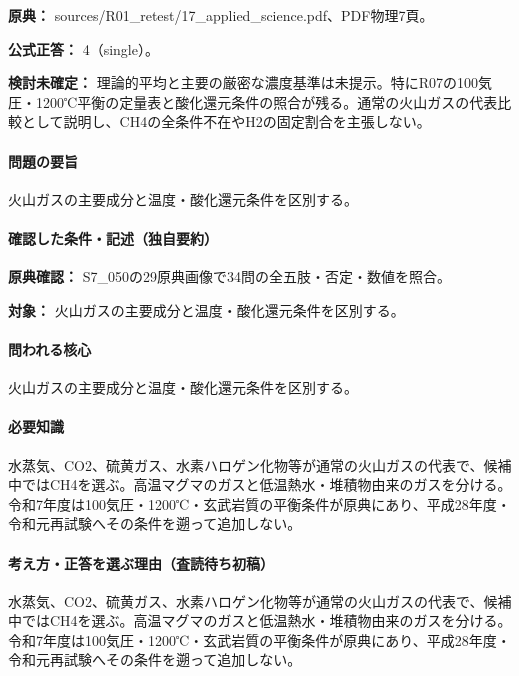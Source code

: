 \noindent\textbf{原典：} sources/R01\_retest/17\_applied\_science.pdf、PDF物理7頁。

\textbf{公式正答：} 4（single）。

\par\textbf{検討未確定：} 理論的平均と主要の厳密な濃度基準は未提示。特にR07の100気圧・1200℃平衡の定量表と酸化還元条件の照合が残る。通常の火山ガスの代表比較として説明し、CH4の全条件不在やH2の固定割合を主張しない。

\paragraph{問題の要旨} 火山ガスの主要成分と温度・酸化還元条件を区別する。

\paragraph{確認した条件・記述（独自要約）}\mbox{}\par

\noindent\textbf{原典確認：} S7\_050の29原典画像で34問の全五肢・否定・数値を照合。\par

\noindent\textbf{対象：} 火山ガスの主要成分と温度・酸化還元条件を区別する。\par

\paragraph{問われる核心} 火山ガスの主要成分と温度・酸化還元条件を区別する。

\paragraph{必要知識} 水蒸気、CO2、硫黄ガス、水素ハロゲン化物等が通常の火山ガスの代表で、候補中ではCH4を選ぶ。高温マグマのガスと低温熱水・堆積物由来のガスを分ける。令和7年度は100気圧・1200℃・玄武岩質の平衡条件が原典にあり、平成28年度・令和元再試験へその条件を遡って追加しない。

\paragraph{考え方・正答を選ぶ理由（査読待ち初稿）} 水蒸気、CO2、硫黄ガス、水素ハロゲン化物等が通常の火山ガスの代表で、候補中ではCH4を選ぶ。高温マグマのガスと低温熱水・堆積物由来のガスを分ける。令和7年度は100気圧・1200℃・玄武岩質の平衡条件が原典にあり、平成28年度・令和元再試験へその条件を遡って追加しない。

